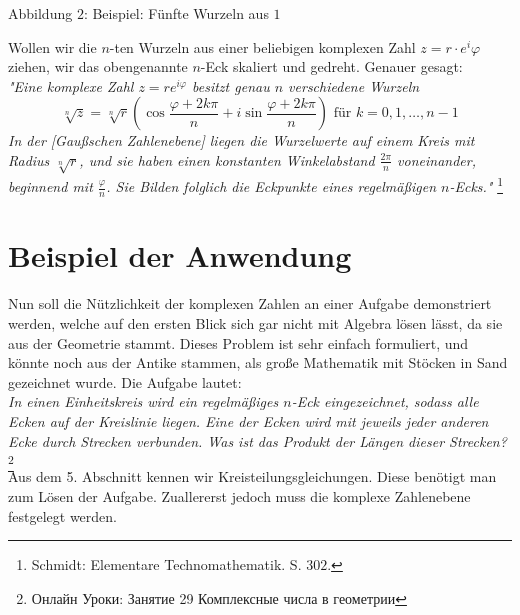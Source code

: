 \documentclass[a4paper,12pt]{article} %
\begin{document}
\begin{center}
	\begin{small}
		Abbildung $2$: Beispiel: Fünfte Wurzeln aus $1$
	\end{small}
\end{center}

Wollen wir die $n$-ten Wurzeln aus einer beliebigen komplexen Zahl $z=r\cdot e^i\varphi$ ziehen, wir das obengenannte $n$-Eck skaliert und gedreht.
Genauer gesagt:\\

\noindent\emph{"{}Eine komplexe Zahl $z=r e^{i\varphi}$ besitzt genau $n$ verschiedene Wurzeln}
\begin{equation}\label{vieleck}
	\sqrt[n]{z}=\sqrt[n]{r}\left(\cos\frac{\varphi+2k\pi}{n}+i\sin\frac{\varphi+2k\pi}{n}\right) \textrm{ für } k=0, 1, \dots, n-1
\end{equation}
\emph{In der [Gaußschen Zahlenebene] liegen die Wurzelwerte auf einem Kreis mit Radius $\sqrt[n]{r}$, und sie haben einen konstanten Winkelabstand $\frac{2\pi}{n}$ voneinander, beginnend mit $\frac{\varphi}{n}$. Sie Bilden folglich die Eckpunkte eines regelmäßigen $n$-Ecks."} \footnote{Schmidt: Elementare Technomathematik. S. $302$.}











\section{Beispiel der Anwendung}

Nun soll die Nützlichkeit der komplexen Zahlen an einer Aufgabe demonstriert werden, welche auf den ersten Blick sich gar nicht mit Algebra lösen lässt, da sie aus der Geometrie stammt. Dieses Problem ist sehr einfach formuliert, und könnte noch aus der Antike stammen, als große Mathematik mit Stöcken in Sand gezeichnet wurde. Die Aufgabe lautet:\\

\noindent \textit{In einen Einheitskreis wird ein regelmäßiges $n$-Eck eingezeichnet, sodass alle Ecken auf der Kreislinie liegen.
Eine der Ecken wird mit jeweils jeder anderen Ecke durch Strecken verbunden.
Was ist das Produkt der Längen dieser Strecken?}\footnote{Онлайн Уроки: Занятие 29 Комплексные числа в геометрии}\\


Aus dem 5. Abschnitt kennen wir Kreisteilungsgleichungen. Diese benötigt man zum Lösen der Aufgabe. Zuallererst jedoch muss die komplexe Zahlenebene festgelegt werden. 
\end{document}
